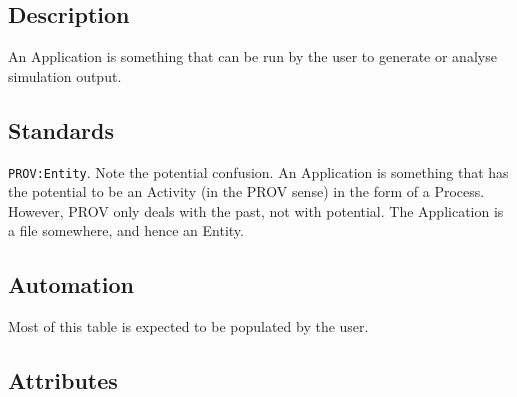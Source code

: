 \subsection{Description}\label{description}

An Application is something that can be run by the user to generate or
analyse simulation output.

\subsection{Standards}\label{standards-1}

\texttt{PROV:Entity}. Note the potential confusion. An Application is
something that has the potential to be an Activity (in the PROV sense)
in the form of a Process. However, PROV only deals with the past, not
with potential. The Application is a file somewhere, and hence an
Entity.

\subsection{Automation}\label{automation-1}

Most of this table is expected to be populated by the user.

\subsection{Attributes}\label{attributes-2}

